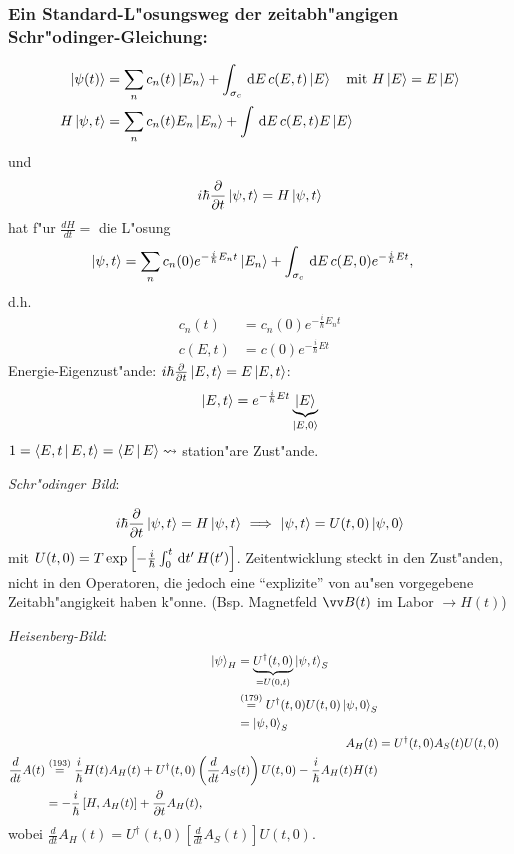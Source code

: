\documentclass[a4paper]{scrartcl}
\newcommand{\dd}{\ensuremath \, \mathrm{d}}
\begin{document}
{\subsubsection*{Ein Standard-L"osungsweg der zeitabh"angigen Schr"odinger-Gleichung:}
\begin{align*}
\Ket{ \psi(t) } & = \sum_n c_n(t) \Ket{ E_n} + \int_{\sigma_c} \dd E \, c(E, t) \Ket{E} \quad \mathrm{ mit \ } H \Ket{E} = E \Ket{E} \\
H \Ket{ \psi, t} & = \sum_n c_n(t) E_n \Ket{ E_n } + \int \dd E \, c(E,t) E \Ket E
\end{align*}
und
$$i \hbar \frac \partial {\partial t} \Ket{ \psi, t} = H \Ket{ \psi, t}$$
hat f"ur $\frac {dH}{dt} = $ die L"osung
\begin{align}
\Ket{ \psi, t} & = \sum_n c_n(0) e^{- \frac i \hbar E_n t} \Ket{ E_n} + \int_{\sigma_c} \dd E \, c(E, 0) e^{- \frac i \hbar E t},
\end{align}
d.h.
\begin{align*}
c_n(t) & = c_n(0) e^{- \frac i \hbar E_n t} \\
c(E,t) & = c(0) e^{- \frac i \hbar E t}
\end{align*}
Energie-Eigenzust"ande: $i \hbar \frac \partial {\partial t} \ket{ E, t} = E \Ket{ E, t}$:
$$\Ket{ E, t} = e^{- \frac i \hbar E t} \underbrace{ \Ket{ E }}_{ \Ket{ E, 0}}$$
$1 = \Braket { E,t | E, t} = \Braket{ E | E} \leadsto$ station"are Zust"ande.

\emph{Schr"odinger Bild}:

\begin{align}
i \hbar \frac{ \partial}{\partial t} \Ket{ \psi, t} = H \Ket{ \psi , t} \ \Longrightarrow \ \Ket{ \psi, t} = U(t,0) \Ket{ \psi, 0}
\end{align}
mit $U(t, 0) = T \exp \left[ - \frac i \hbar \int_0^t \dd t' \, H(t') \right]$. Zeitentwicklung steckt in den Zust"anden, nicht in den Operatoren, die jedoch eine "`explizite"' von au"sen vorgegebene Zeitabh"angigkeit haben k"onne. (Bsp. Magnetfeld $\vv B(t)$ im Labor $\rightarrow H(t)$)

\emph{Heisenberg-Bild}:
\begin{align}
\begin{split}
\Ket \psi_H & = \underbrace{ U^\dagger(t,0)}_{=U(0,t)} \Ket {\psi, t}_S \\
& \stackrel{(179)}= U^\dagger(t,0) U(t,0) \Ket{ \psi, 0}_S \\
& = \Ket{ \psi, 0}_S
\end{split} \\
A_H(t) & = U^\dagger(t,0) A_S(t) U(t,0) \\
\begin{split}
\frac d {dt} A(t) & \stackrel{(193)}= \frac i \hbar H(t) A_H(t) + U^\dagger (t,0) \left( \frac d {dt} A_S(t) \right) U(t,0) - \frac i \hbar A_H(t) H(t) \\
& = - \frac i \hbar \left[ H, A_H(t) \right] + \frac \partial {\partial t} A_H(t),
\end{split}
\end{align}
wobei $\frac d {dt} A_H(t) = U^\dagger(t,0) \left[ \frac d {dt} A_S(t) \right] U(t,0)$.

}
\end{document}

